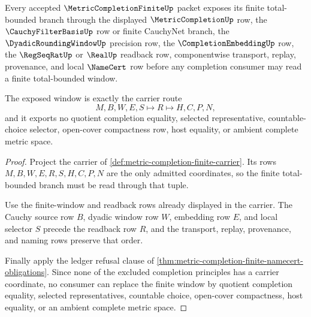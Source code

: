\begin{theorem}
\label{thm:metric-completion-finite-total-bounded-window}
Every accepted $\MetricCompletionFiniteUp$ packet exposes its finite total-bounded branch through the displayed $\MetricCompletionUp$ row, the $\CauchyFilterBasisUp$ row or finite CauchyNet branch, the $\DyadicRoundingWindowUp$ precision row, the $\CompletionEmbeddingUp$ row, the $\RegSeqRatUp$ or $\RealUp$ readback row, componentwise transport, replay, provenance, and local $\NameCert$ row before any completion consumer may read a finite total-bounded window.

The exposed window is exactly the carrier route
$$
M,B,W,E,S \longmapsto R \longmapsto H,C,P,N ,
$$
and it exports no quotient completion equality, selected representative, countable-choice selector, open-cover compactness row, host equality, or ambient complete metric space.
\end{theorem}
\begin{proof}
Project the carrier of \autoref{def:metric-completion-finite-carrier}. Its rows $M,B,W,E,R,S,H,C,P,N$ are the only admitted coordinates, so the finite total-bounded branch must be read through that tuple.

Use the finite-window and readback rows already displayed in the carrier. The Cauchy source row $B$, dyadic window row $W$, embedding row $E$, and local selector $S$ precede the readback row $R$, and the transport, replay, provenance, and naming rows preserve that order.

Finally apply the ledger refusal clause of \autoref{thm:metric-completion-finite-namecert-obligations}. Since none of the excluded completion principles has a carrier coordinate, no consumer can replace the finite window by quotient completion equality, selected representatives, countable choice, open-cover compactness, host equality, or an ambient complete metric space.
\end{proof}

